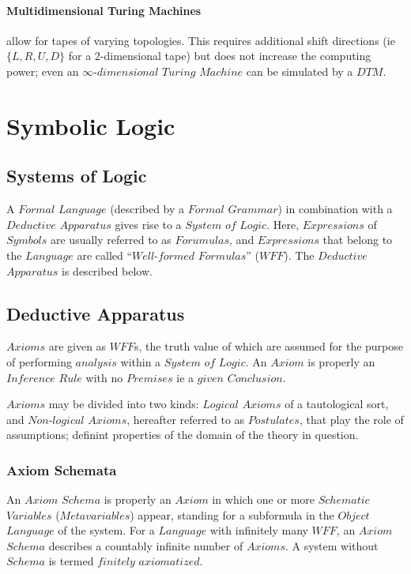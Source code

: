 \documentclass{article}
\begin{document}
\paragraph{Multidimensional Turing Machines} allow for tapes of
varying topologies. This requires additional shift directions (ie
$\{L, R, U, D\}$ for a 2-dimensional tape) but does not increase the
computing power; even an $\infty$-$dimensional$ $Turing$ $Machine$ can
be simulated by a $DTM$.


\section{Symbolic Logic}

\subsection{Systems of Logic}

A $Formal$ $Language$ (described by a $Formal$ $Grammar$) in combination
with a $Deductive$ $Apparatus$ gives rise to a $System$ $of$ $Logic$. Here,
$Expressions$ of $Symbols$ are usually referred to as $Forumulas$, and
$Expressions$ that belong to the $Language$ are called
``$Well$-$formed$ $Formulas$'' ($WFF$). The $Deductive$ $Apparatus$ is
described below.

\subsection{Deductive Apparatus}
\label{subsec:deductive_apparatus}

$Axioms$ are given as $WFF$s, the truth value of which are assumed for
the purpose of performing $analysis$ within a $System$ $of$ $Logic$.
An $Axiom$ is properly an $Inference$ $Rule$ with no $Premises$ ie a
$given$ $Conclusion$.

$Axioms$ may be divided into two kinds: $Logical$ $Axioms$ of a
tautological sort, and $Non$-$logical$ $Axioms$, hereafter referred to
as $Postulates$, that play the role of assumptions; definint
properties of the domain of the theory in question.

\subsubsection{Axiom Schemata}

An $Axiom$ $Schema$ is properly an $Axiom$ in which one or more
$Schematic$ $Variables$ ($Metavariables$) appear, standing for a
subformula in the $Object$ $Language$ of the system. For a $Language$
with infinitely many $WFF$, an $Axiom$ $Schema$ describes a countably
infinite number of $Axioms$. A system without $Schema$ is termed
$finitely$ $axiomatized$.
\end{document}
